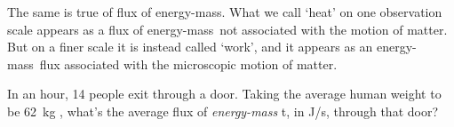 \documentclass[a4paper,12pt,%
onecolumn,oneside,%
british%
]{memoir}
\renewcommand*{\|}[1][]{\nonscript\:#1\vert\nonscript\:\mathopen{}}
\newcommand*{\sect}{\S}%
\newcommand*{\energym}{energy-mass}
\newcommand*{\masse}{mass-energy}
\begin{document}
The same is true of flux of \energym. What we call \enquote*{heat} on one observation scale appears as a flux of \energym\ not associated with the motion of matter. But on a finer scale it is instead called \enquote*{work}, and it appears as an \energym\ flux associated with the microscopic motion of matter. %



%
%


\begin{exercise}
  In an hour, 14 people exit through a door. Taking the average human weight to be \qty{62}{kg} \parencites{walpoleetal2012}, what's the average flux of \emph{\energym} t, in \unit{J/s}, through that door?
\end{exercise}
\end{document}
